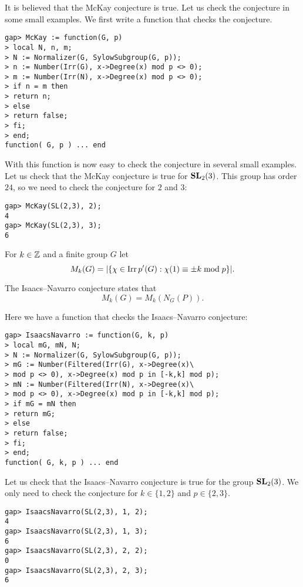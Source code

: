 \begin{example}
It is believed that the McKay conjecture is true.  Let us check the conjecture
in some small examples. We first write a function that checks the conjecture.

\begin{lstlisting}
gap> McKay := function(G, p)
> local N, n, m;
> N := Normalizer(G, SylowSubgroup(G, p));
> n := Number(Irr(G), x->Degree(x) mod p <> 0);
> m := Number(Irr(N), x->Degree(x) mod p <> 0);
> if n = m then
> return n;
> else
> return false;
> fi;
> end;
function( G, p ) ... end
\end{lstlisting}
With this function is now easy to check the conjecture in several small
examples. Let us check that the McKay conjecture is true for $\mathbf{SL}_2(3)$. This
group has order $24$, so we need to check the conjecture for $2$ and $3$: 
\begin{lstlisting}
gap> McKay(SL(2,3), 2);
4
gap> McKay(SL(2,3), 3);
6
\end{lstlisting}
\end{example}

For $k\in\mathbb{Z}$ and a finite group $G$ let
\[
  M_k(G)=|\{\chi\in\operatorname{Irr}{p'}(G):\chi(1)\equiv\pm k\bmod p\}|.
\]

The Isaacs--Navarro conjecture states that 
\[
    M_k(G)=M_k(N_G(P)).
\]

\begin{example}
Here we have a function that checks the Isaacs--Navarro conjecture:
\begin{lstlisting}
gap> IsaacsNavarro := function(G, k, p)
> local mG, mN, N;
> N := Normalizer(G, SylowSubgroup(G, p));
> mG := Number(Filtered(Irr(G), x->Degree(x)\
> mod p <> 0), x->Degree(x) mod p in [-k,k] mod p);
> mN := Number(Filtered(Irr(N), x->Degree(x)\
> mod p <> 0), x->Degree(x) mod p in [-k,k] mod p);
> if mG = mN then
> return mG;
> else
> return false;
> fi;
> end;
function( G, k, p ) ... end
\end{lstlisting}

Let us check that the Isaacs--Navarro conjecture is true for the group
$\mathbf{SL}_2(3)$. We only need to check the conjecture for $k\in\{1,2\}$ and
$p\in\{2,3\}$. 
\begin{lstlisting}
gap> IsaacsNavarro(SL(2,3), 1, 2);
4
gap> IsaacsNavarro(SL(2,3), 1, 3);
6
gap> IsaacsNavarro(SL(2,3), 2, 2);
0
gap> IsaacsNavarro(SL(2,3), 2, 3);
6
\end{lstlisting}
\end{example}


